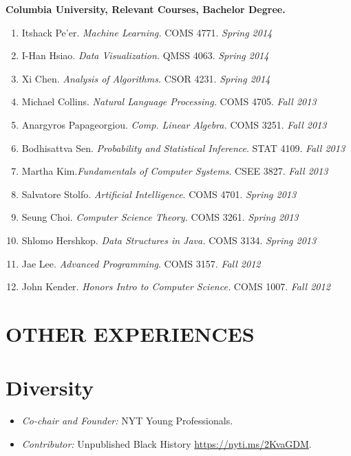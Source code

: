 \documentclass[margin]{res}
\newcommand{\fullhrulefill}{%
	\vspace{.7\baselineskip}
	\hspace*{-\sectionwidth}\hrulefill%
}
\begin{document}
\begin{resume}
\begin{enumerate}
\end{enumerate}
\textbf{Columbia University, Relevant Courses, Bachelor Degree.}
\begin{enumerate}
	\item Itshack Pe'er.\textit{ Machine Learning.} COMS 4771. \hfill \textit{Spring 2014}
	\item I-Han Hsiao. \textit{Data Visualization.} QMSS 4063. \hfill \textit{Spring 2014}
	\item Xi Chen. \textit{Analysis of Algorithms.} CSOR 4231. \hfill \textit{Spring 2014}
	\item Michael Collins.\textit{ Natural Language Processing.} COMS 4705. \hfill \textit{Fall 2013}
	\item Anargyros Papageorgiou. \textit{Comp. Linear Algebra.} COMS 3251. \hfill \textit{Fall 2013}
	\item Bodhisattva Sen. \textit{Probability and Statistical Inference}. STAT 4109. \hfill \textit{Fall 2013}
	\item Martha Kim.\textit{Fundamentals of Computer Systems}. CSEE 3827. \hfill \textit{Fall 2013}
	\item Salvatore Stolfo. \textit{Artificial Intelligence}. COMS 4701. \hfill \textit{Spring 2013}
	\item Seung Choi. \textit{Computer Science Theory.} COMS 3261. \hfill \textit{Spring 2013}
	\item Shlomo Hershkop. \textit{Data Structures in Java.} COMS 3134. \hfill \textit{Spring 2013}
	\item Jae Lee. \textit{Advanced Programming}. COMS 3157. \hfill \textit{Fall 2012}
	\item John Kender. \textit{Honors Intro to Computer Science.} COMS 1007. \hfill \textit{Fall 2012}
\end{enumerate}

\vspace{1\baselineskip}
\section{OTHER EXPERIENCES}
\vspace{1\baselineskip}
\fullhrulefill

\section{Diversity}
\begin{itemize}
	\item {\sl Co-chair and Founder:} NYT Young Professionals.
	\item {\sl Contributor:} Unpublished Black History \url{https://nyti.ms/2KvaGDM}.
\end{itemize}

\end{resume}
\end{document}
